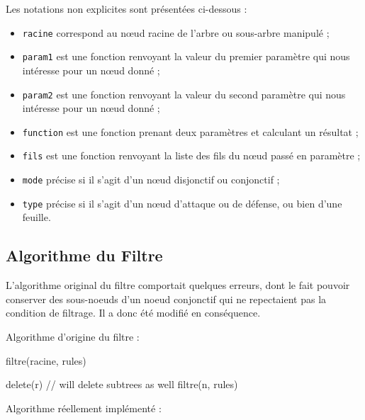  Les notations non explicites sont présentées ci-dessous :
        \begin{itemize}
            \item \verb|racine| correspond au nœud racine de l'arbre ou sous-arbre manipulé ;
            \item \verb|param1| est une fonction renvoyant la valeur du premier paramètre qui nous intéresse pour un nœud donné ;
            \item \verb|param2| est une fonction renvoyant la valeur du second paramètre qui nous intéresse pour un nœud donné ;
            \item \verb|function| est une fonction prenant deux paramètres et calculant un résultat ;
            \item \verb|fils| est une fonction renvoyant la liste des fils du nœud passé en paramètre ;
            \item \verb|mode| précise si il s'agit d'un nœud disjonctif ou conjonctif ;
            \item \verb|type| précise si il s'agit d'un nœud d'attaque ou de défense, ou bien d'une feuille.
        \end{itemize}

\subsection{Algorithme du Filtre}

L'algorithme original du filtre comportait quelques erreurs, dont le fait pouvoir conserver des sous-noeuds d'un noeud conjonctif qui ne repectaient pas la condition de filtrage. Il a donc été modifié en conséquence.

Algorithme d'origine du filtre :

 	\begin{algorithm}[h!]
            \caption{filtre(racine, rules)}
            \label{algo:filtre}
            \begin{algorithmic}
                        \STATE delete(r) // will delete subtrees as well
                        \RETURN
                    \ENDIF
                \ENDFOR
                \STATE
                    \STATE filtre(n, rules)
                \ENDFOR
            \end{algorithmic}
        \end{algorithm}

Algorithme réellement implémenté :

